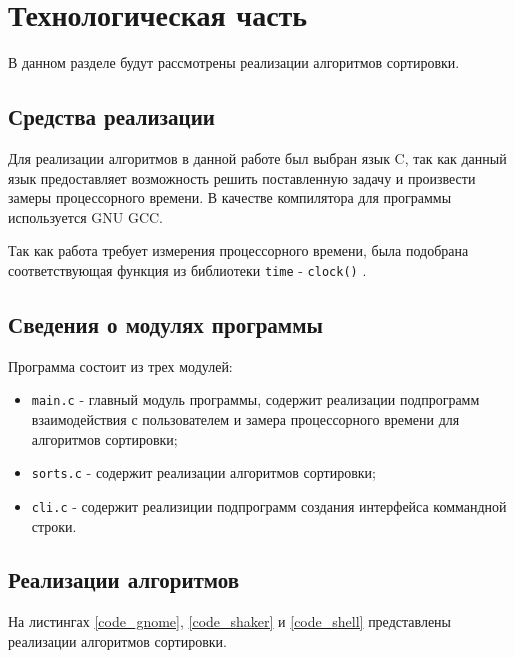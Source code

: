 \section{Технологическая часть}
В данном разделе будут рассмотрены реализации алгоритмов сортировки.

\subsection{Средства реализации}
Для реализации алгоритмов в данной работе был выбран язык C, так как
данный язык предоставляет возможность решить поставленную задачу и произвести
замеры процессорного времени. В качестве компилятора для программы используется
GNU GCC.

Так как работа требует измерения процессорного времени, была подобрана
соответствующая функция из библиотеки \verb+time+ - \verb+clock()+
\cite{CPUtime}.

\subsection{Сведения о модулях программы}
Программа состоит из трех модулей:
\begin{itemize}
    \item \verb+main.c+ - главный модуль программы, содержит реализации
          подпрограмм взаимодействия с пользователем и замера процессорного
          времени для алгоритмов сортировки;
    \item \verb+sorts.c+ - содержит реализации алгоритмов сортировки;
    \item \verb+cli.c+ - содержит реализиции подпрограмм создания интерфейса
          коммандной строки.
\end{itemize}

\subsection{Реализации алгоритмов}
На листингах \ref{code_gnome}, \ref{code_shaker} и \ref{code_shell} представлены
реализации алгоритмов сортировки.




\vfill
\pagebreak

\vspace*{\fill}

\vfill
\pagebreak

